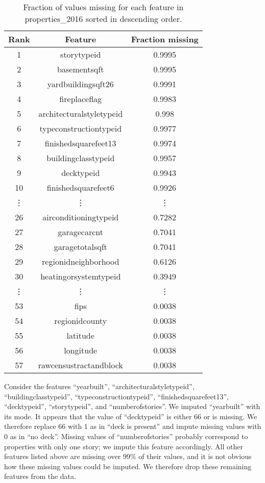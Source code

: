 \documentclass[12pt]{article}
\begin{document}
\begin{table}
\centering
\caption{\label{table-miss} Fraction of values missing for each feature in properties\_2016 sorted in descending order.}
\begin{tabular}{|c|c|c|} \hline
Rank & Feature & Fraction missing \\ \hline
1 & storytypeid & 0.9995 \\
2 & basementsqft & 0.9995 \\
3 & yardbuildingsqft26 & 0.9991 \\
4 & fireplaceflag & 0.9983 \\
5 & architecturalstyletypeid & 0.998 \\
6 & typeconstructiontypeid & 0.9977 \\
7 & finishedsquarefeet13 & 0.9974 \\
8 & buildingclasstypeid & 0.9957 \\
9 & decktypeid & 0.9943 \\
10 & finishedsquarefeet6 & 0.9926 \\
\vdots & \vdots & \vdots \\
26 & airconditioningtypeid & 0.7282 \\
27 & garagecarcnt & 0.7041 \\
28 & garagetotalsqft & 0.7041 \\
29 & regionidneighborhood & 0.6126 \\
30 & heatingorsystemtypeid & 0.3949 \\
\vdots & \vdots & \vdots \\
53 & fips & 0.0038 \\
54 & regionidcounty & 0.0038 \\
55 & latitude & 0.0038 \\
56 & longitude & 0.0038 \\
57 & rawcensustractandblock & 0.0038 \\
\hline
\end{tabular}
\end{table}

Consider the features ``yearbuilt'', ``architecturalstyletypeid'', ``buildingclasstypeid'', ``typeconstructiontypeid'', ``finishedsquarefeet13'', ``decktypeid'', ``storytypeid'', and ``numberofstories''. We imputed ``yearbuilt'' with its mode. It appears that the value of ``decktypeid'' is either 66 or is missing. We therefore replace 66 with $1$ as in ``deck is present'' and impute missing values with $0$ as in ``no deck''. Missing values of ``numberofstories'' probably correspond to properties with only one story; we impute this feature accordingly. All other features listed above are missing over 99\% of their values, and it is not obvious how these missing values could be imputed. We therefore drop these remaining features from the data.
\end{document}
